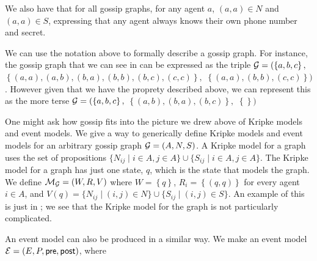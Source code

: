 \documentclass[12pt, a4paper]{article}
\begin{document}
We also have that for all gossip graphs, for any agent $a$, $(a, a) \in N$ and $(a, a)
 \in S$, expressing that any agent always knows their own phone number and
 secret.

\bigskip
 
We can use the notation above to formally describe a gossip graph. For instance,
the gossip graph that we can see in  can be expressed as
the triple $\mathcal{G} = (\left\{ a, b, c \right\},$ $ \left\{ (a, a), (a, b), (b, a), (b,
  b), (b, c), (c, c) \right\},$ $ \left\{ (a, a), (b, b), (c, c) \right\})$.
However given that we have the proprety described above, we can represent this
as the more terse $\mathcal{G} = (\left\{ a, b, c \right\},$ $ \left\{ (a, b), (b,
  a), (b, c)
\right\}, $ $ \left\{ \right\})$

\bigskip

One might ask how gossip fits into the picture we drew above of Kripke models
and event models. We give a way to generically define Kripke models and event
models for an arbitrary gossip graph $\mathcal{G} = (A, N, S)$. A Kripke model for a
graph  uses the set of propositions $\{N_{ij} \mid i \in A, j \in A\}
\cup \{S_{ij} \mid i \in A, j \in A\}$. The Kripke model for a graph  has
just one state, $q$, which is the state that models the graph. We define
$\mathcal{M_G} = (W, R, V)$ where $W = \left\{ q \right\}$, $R_i = \left\{ (q, q)
\right\}$ for every agent $i \in A$, and $V(q) = \{N _{ij} \mid (i, j) \in N\}
\cup \{S_{ij} \mid (i, j) \in S\}$. An example of this is just in
; we see that the Kripke model for the graph is not
particularly complicated. 

An event model can also be produced in a similar way. We make an event model
$\mathcal{E} = (E, P, \textsf{pre}, \textsf{post})$, where
\end{document}
